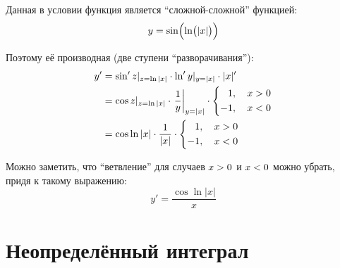 \documentclass[a4paper,12pt]{article}
\begin{document}
  \begin{solution}
    Данная в условии функция является ``сложной-сложной'' функцией:
    \[
      y = \sin\Bigl( \ln\bigl( |x| \bigr) \Bigr)
    \]
    
    Поэтому её производная (две ступени ``разворачивания''):
    \begin{equation*}
    \begin{split}
      y' &= \sin'{z}|_{z = \ln |x|} \cdot \ln'{y}|_{y = |x|} \cdot |x|'\\
      &= \cos{z}|_{z = \ln |x|} \cdot \left.\frac{1}{y}\right|_{y = |x|} \cdot \left\{
        \begin{aligned}
          &\hphantom{{+}}1,\quad x > 0\\
          &{-}1,\quad x < 0
        \end{aligned}
      \right.\\  %
      &= \cos \ln |x| \cdot \frac{1}{|x|} \cdot \left\{
        \begin{aligned}
          &\hphantom{{+}}1,\quad x > 0\\
          &{-}1,\quad x < 0
        \end{aligned}
      \right.
    \end{split}
    \end{equation*}
    
    Можно заметить, что ``ветвление'' для случаев $x \hm> 0$ и $x \hm< 0$ можно убрать, придя к такому выражению:
    \[
      y' = \frac{\cos \ln |x|}{x}
    \]
  \end{solution}
  
  
  
  
  
  
  \section{Неопределённый интеграл}
  
\end{document}

